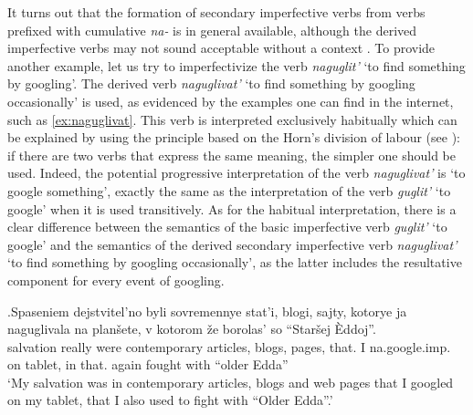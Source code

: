 It turns out that the formation of secondary imperfective  verbs  from verbs prefixed with cumulative  \textit{na-}   is in general available, although the derived imperfective verbs  may not sound acceptable without a context  . To provide another example, let us try to imperfectivize the verb \textit{naguglit'} `to find something by googling'. The derived verb \textit{naguglivat'} `to find something by googling occasionally' is used, as evidenced by the examples one can find in the internet, such as \ref{ex:naguglivat}. This verb is interpreted exclusively habitually which can be explained by using the principle based on the Horn's division of labour (see \citealt{Horn:84}): if there are two verbs that express the same meaning, the simpler one should be used. Indeed, the potential progressive interpretation  of the verb \textit{naguglivat'} is `to google something', exactly the same as the interpretation of the verb \textit{guglit'} `to google' when it is used transitively. As for the habitual interpretation, there is a clear difference between the semantics of the basic imperfective verb  \textit{guglit'} `to google' and the semantics of the derived secondary imperfective  verb  \textit{naguglivat'} `to find something by googling occasionally', as the latter includes the resultative  component for every event of googling. 

\exg.\label{ex:naguglivat}Spaseniem dejstvitel'no byli sovremennye stat'i, blogi, sajty, kotorye ja naguglivala na plan\v{s}ete, v kotorom \v{z}e borolas' so ``Star\v{s}ej \`{E}ddoj''.\\
salvation really were contemporary articles, blogs, pages, that. I na.google.imp. on tablet, in that. again fought with ``older Edda''\\
\trans `My salvation was in contemporary articles, blogs and web pages that I googled on my tablet, that I also used to fight with ``Older Edda''.'\\

